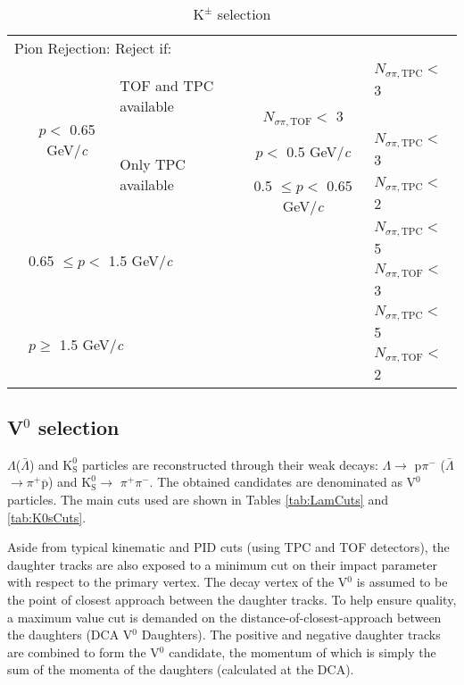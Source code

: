 \documentclass[ALICE,manyauthors]{cernphprep}
\newcommand{\Lam}{$\Lambda$\xspace}
\newcommand{\ALam}{$\bar{\Lambda}$\xspace}
\newcommand{\LamALam}{$\Lambda$($\bar{\Lambda}$)\xspace}
\newcommand{\Kpm}{$\mathrm{K^{\pm}}$\xspace}
\newcommand{\Ks}{$\mathrm{K^{0}_{S}}$\xspace}
\newcommand{\Vz}{V$^{0}$\xspace}
\begin{document}
\begin{table}[htbp]
\begin{tabular}{lcc|c|l}
   \multicolumn{5}{l}{Pion Rejection:  Reject if:} \\
   \cline{2-5}
   \multirow{4}{*}{} & \multirow{4}{*}{$p <$ 0.65 GeV/\textit{c}} & \multicolumn{1}{l}{\multirow{2}{*}{TOF and TPC available}} & \multicolumn{1}{c|}{} & $N_{\sigma \pi,\mathrm{TPC}} <$ 3 \\
   \multicolumn{4}{c|}{} & $N_{\sigma \pi,\mathrm{TOF}} <$ 3 \\
   \cline{3-5}
   \multicolumn{2}{c}{} & \multicolumn{1}{l|}{\multirow{2}{*}{Only TPC available}} & $p <$ 0.5 GeV/\textit{c} & $N_{\sigma \pi,\mathrm{TPC}} <$ 3 \\
   \cline{4-5}
   \multicolumn{3}{c|}{} & 0.5 $\leq p <$ 0.65 GeV/\textit{c} & $N_{\sigma \pi,\mathrm{TPC}} <$ 2 \\
   \cline{2-5}
    & \multicolumn{3}{l|}{\multirow{2}{*}{0.65 $\leq p <$ 1.5 GeV/\textit{c}}} & $N_{\sigma \pi,\mathrm{TPC}} <$ 5 \\
    \multicolumn{4}{c|}{} & $N_{\sigma \pi,\mathrm{TOF}} <$ 3 \\
   \cline{2-5}
    & \multicolumn{3}{l|}{\multirow{2}{*}{$p \geq$ 1.5 GeV/\textit{c}}} & $N_{\sigma \pi,\mathrm{TPC}} <$ 5 \\
    \multicolumn{4}{c|}{} & $N_{\sigma \pi,\mathrm{TOF}} <$ 2 \\
   \hline
  \end{tabular}
 \caption{\Kpm selection}
 \label{tab:KchCuts} 
\end{table}





\subsection{\Vz selection}
\label{sec:V0Selection}

\LamALam and \Ks particles are reconstructed through their weak decays: \Lam $\rightarrow$ p$\pi^{-}$ (\ALam $\rightarrow \pi^{+}\overline{\mathrm{p}}$) and \Ks $\rightarrow$ $\pi^{+}\pi^{-}$.
The obtained candidates are denominated as \Vz particles.
The main cuts used are shown in Tables \ref{tab:LamCuts} and \ref{tab:K0sCuts}.

Aside from typical kinematic and PID cuts (using TPC and TOF detectors), the daughter tracks are also exposed to a minimum cut on their impact parameter with respect to the primary vertex.  
The decay vertex of the \Vz is assumed to be the point of closest approach between the daughter tracks.
To help ensure quality, a maximum value cut is demanded on the distance-of-closest-approach between the daughters (DCA \Vz Daughters).
The positive and negative daughter tracks are combined to form the \Vz candidate, the momentum of which is simply the sum of the momenta of the daughters (calculated at the DCA).
\end{document}
